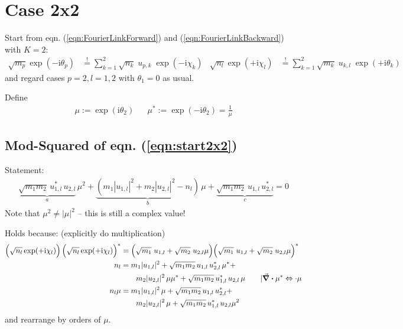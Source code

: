 \documentclass[
	english,
	a4paper,
	fontsize=10pt,
	parskip=half,
	titlepage=true,
	DIV=12,
	final
]{scrreprt}
\let\olddiv\div
\newcommand*{\iunit}{\ensuremath{\mathrm{i}}}
\newcommand*{\equalCond}{  \mathop{=}\limits^!  }
\begin{document}
\section{Case 2x2}
Start from eqn. (\ref{eqn:FourierLinkForward}) and (\ref{eqn:FourierLinkBackward}) with $K=2$:
\begin{align}
	\sqrt{m_p} \exp(-\iunit \theta_p)
&\equalCond
	\sum_{k=1}^{2} \sqrt{n_k} \; u_{p,k} \; \exp(-\iunit\chi_k)
&
	\sqrt{n_l} \exp(+\iunit \chi_l)
&\equalCond
	\sum_{k=1}^{2}
	\sqrt{m_k} \; u_{k,l} \; \exp(+\iunit\theta_k)
\label{eqn:start2x2}
\end{align}
and regard cases $p=2, l = 1, 2$ with $\theta_1 = 0$ as usual.

Define
\begin{align}
	\mu := \exp(\iunit \theta_2)
&&
	\mu^{*} := \exp(-\iunit \theta_2) = \frac{1}{\mu}
\label{eqn:DefMu}
\end{align}

\subsection{Mod-Squared of eqn. (\ref{eqn:start2x2})}
Statement:
\begin{align}
	\underbrace{\sqrt{m_1 m_2} \,
		u_{1, l}^{*} \, u_{2, l}
	}_{a}
	\, \mu^{2}
	+
	\underbrace{
		(m_1 |u_{1,l}|^{2}  +  m_2 |u_{2,l}|^{2} - n_l)
	}_{b}
	\, \mu
	+
	\underbrace{
		\sqrt{m_1 m_2} \,
		u_{1, l} \, u_{2, l}^{*}
	}_{c}
=
	0
\end{align}
Note that $\mu^{2} \neq |\mu|^{2}$ -- this is still a complex value!


Holds because: (explicitly do multiplication)
\begin{align}
	\qty( \Big. \sqrt{n_l} \exp(+\iunit \chi_l) ) \,
	\qty( \Big. \sqrt{n_l} \exp(+\iunit \chi_l) )^{*}
&=
	\qty( \Big.
		\sqrt{m_1} \; u_{1,l} +
		\sqrt{m_2} \; u_{2,l} \mu
	)
	\qty( \Big.
		\sqrt{m_1} \; u_{1,l} +
		\sqrt{m_2} \; u_{2,l} \mu
	)^{*}
\\
	n_l
&=
	m_1 |u_{1,l}|^{2} +
	\sqrt{m_1 m_2} \, u_{1,l}     \, u_{2,l}^{*} \, \mu^{*} +  \\
\nonumber
&\qquad
	m_2 |u_{2,l}|^{2} \, \mu\mu^{*} +
	\sqrt{m_1 m_2} \, u_{1,l}^{*} \, u_{2,l}     \, \mu
\qquad
	| \olddiv \mu^{*} \Leftrightarrow \cdot \mu
\\
	n_l \mu
&=
	m_1 |u_{1,l}|^{2} \, \mu +
	\sqrt{m_1 m_2} \, u_{1,l}     \, u_{2,l}^{*} +  \\
\nonumber
&\qquad
	m_2 |u_{2,l}|^{2} \, \mu +
	\sqrt{m_1 m_2} \, u_{1,l}^{*} \, u_{2,l} \mu^{2}
\end{align}
and rearrange by orders of $\mu$.
\end{document}
